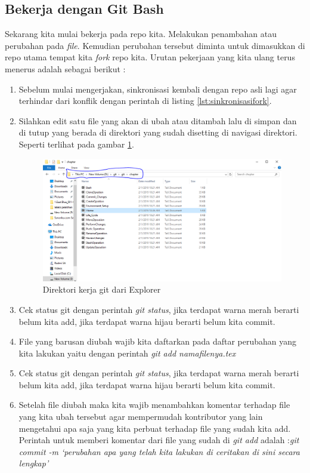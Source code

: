 \subsection{Bekerja dengan Git Bash}
Sekarang kita mulai bekerja pada repo kita. Melakukan penambahan atau perubahan pada \textit{file}. Kemudian perubahan tersebut diminta untuk dimasukkan di repo utama tempat kita \textit{fork} repo kita. Urutan pekerjaan yang kita ulang terus menerus adalah sebagai berikut :
\begin{enumerate}

\item Sebelum mulai mengerjakan, sinkronisasi kembali dengan repo asli lagi agar terhindar dari konflik dengan perintah di listing \ref{lst:sinkronisasifork}.

\item Silahkan edit satu file yang akan di ubah atau ditambah lalu di simpan dan di tutup yang berada di direktori yang sudah disetting di navigasi direktori. Seperti terlihat pada gambar \ref{penanda}.
    \begin{figure}[!htbp]
        \centering
            \includegraphics[width=.75\textwidth]{Figures/Capture}
            \caption{Direktori kerja git dari Explorer}
        \label{penanda}
    \end{figure}
\item Cek status git dengan perintah \textit{git status}, jika terdapat warna merah berarti belum kita add, jika terdapat warna hijau berarti belum kita commit.
\item File yang barusan diubah wajib kita daftarkan pada daftar perubahan yang kita lakukan yaitu dengan perintah \textit{git add namafilenya.tex}
\item Cek status git dengan perintah \textit{git status}, jika terdapat warna merah berarti belum kita add, jika terdapat warna hijau berarti belum kita commit.
\item Setelah file diubah maka kita wajib menambahkan komentar terhadap file yang kita ubah tersebut agar mempermudah kontributor yang lain mengetahui apa saja yang kita perbuat terhadap file yang sudah kita add. Perintah untuk memberi komentar dari file yang sudah di \textit{git add} adalah :\textit{git commit -m `perubahan apa yang telah kita lakukan di ceritakan di sini secara lengkap'}

\end{enumerate}
